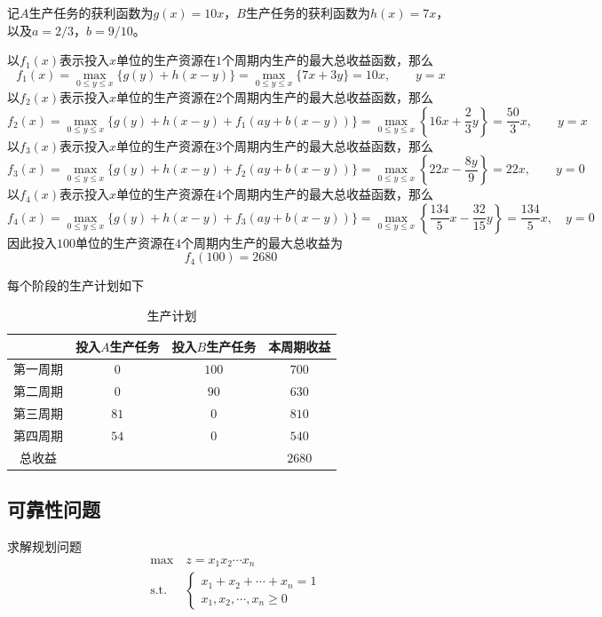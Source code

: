 \documentclass[lang = cn, scheme = chinese, thmcnt = section]{elegantbook}
\begin{document}
\begin{solution}
	记$A$生产任务的获利函数为$g(x)=10x$，$B$生产任务的获利函数为$h(x)=7x$，以及$a=2/3$，$b=9/10$。
	
	以$f_1(x)$表示投入$x$单位的生产资源在$1$个周期内生产的最大总收益函数，那么
	$$
	f_1(x)
	=\max_{0\le y \le x}\{ g(y)+h(x-y) \}
	=\max_{0\le y \le x}\{ 7x+3y \}
	=10x,\qquad y=x
	$$
	以$f_2(x)$表示投入$x$单位的生产资源在$2$个周期内生产的最大总收益函数，那么
	$$
	f_{2}(x)
	=\max_{0\le y \le x}\{ g(y)+h(x-y)+f_{1}(ay+b(x-y)) \}
	=\max_{0\le y \le x}\left\{16x+\frac{2}{3}y\right\}
	=\frac{50}{3}x,\qquad y=x
	$$
	以$f_3(x)$表示投入$x$单位的生产资源在$3$个周期内生产的最大总收益函数，那么
	$$
	f_{3}(x)
	=\max_{0\le y \le x}\{ g(y)+h(x-y)+f_{2}(ay+b(x-y)) \}
	=\max_{0\le y \le x}\left\{22 x-\frac{8 y}{9}\right\}
	=22x,\qquad y=0
	$$
	以$f_4(x)$表示投入$x$单位的生产资源在$4$个周期内生产的最大总收益函数，那么
	$$
	f_{4}(x)
	=\max_{0\le y \le x}\{ g(y)+h(x-y)+f_{3}(ay+b(x-y)) \}
	=\max_{0\le y \le x}\left\{\frac{134}{5}x-\frac{32}{15}y\right\}
	=\frac{134}{5}x,\quad y=0
	$$
	因此投入$100$单位的生产资源在$4$个周期内生产的最大总收益为
	$$
	f_4(100)=2680
	$$
	
	每个阶段的生产计划如下
	\begin{table}[H]
		\centering
		\caption{生产计划}
		\begin{tabular}{c|ccc}
			\hline
			 & 投入$A$生产任务 & 投入$B$生产任务 & 本周期收益 \\ \hline
			第一周期 & $0$ & $100$ & $700$ \\
			第二周期 & $0$ & $90$ & $630$ \\
			第三周期 & $81$ & $0$ & $810$ \\
			第四周期 & $54$ & $0$ & $540$ \\ \hline
			总收益 & & & $2680$ \\ \hline
		\end{tabular}
	\end{table}
\end{solution}

\subsection{可靠性问题}

\begin{example}
	求解规划问题
	\begin{align*}
		& \text{max}  \quad z=x_1x_2\cdots x_n\\
		& \text{s.t.} \;\, \quad \begin{cases}
			x_1+x_2+\cdots+x_n=1\\
			x_1,x_2,\cdots,x_n\ge 0
		\end{cases}
	\end{align*}
\end{example}
\end{document}
